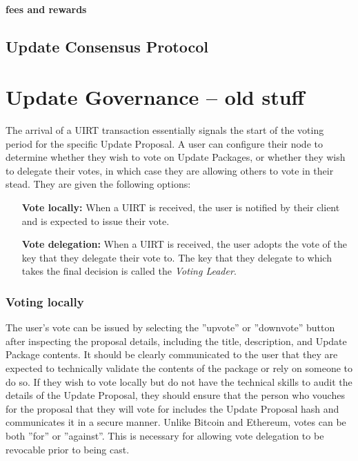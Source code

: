 \paragraph{fees and rewards}

\subsection{Update Consensus Protocol}


\section*{Update Governance -- old stuff}
The arrival of a UIRT transaction essentially signals the start of the voting period for the specific Update Proposal. A user can configure their node to determine whether they wish to vote on Update Packages, or whether they wish to delegate their votes, in which case they are allowing others to vote in their stead. They are given the following options:

\begin{itemize}
\item[\textbf{Vote locally:}] When a UIRT is received, the user is notified by their client and is expected to issue their vote.
\item[\textbf{Vote delegation:}] When a UIRT is received, the user adopts the vote of the key that they delegate their vote to. The key that they delegate to which takes the final decision is called the \emph{Voting Leader}.
\end{itemize}

\subsubsection*{Voting locally} 

The user's vote can be issued by selecting the ''upvote'' or ''downvote'' button after inspecting the proposal details, including the title, description, and Update Package contents. It should be clearly communicated to the user that they are expected to technically validate the contents of the package or rely on someone to do so. If they wish to vote locally but do not have the technical skills to audit the details of the Update Proposal, they should ensure that the person who vouches for the proposal that they will vote for includes the Update Proposal hash and communicates it in a secure manner. Unlike Bitcoin and Ethereum, votes can be both ''for'' or ''against''. This is necessary for allowing vote delegation to be revocable prior to being cast.


